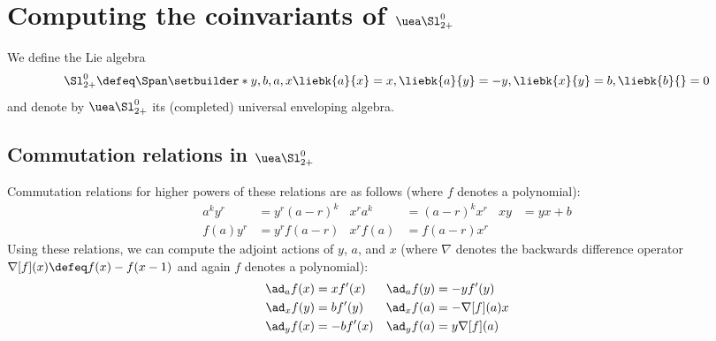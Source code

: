 \documentclass{article}
\begin{document}
\section{Computing the coinvariants of $\CU$}
\begin{definition}
       We define the Lie algebra
       \begin{equation}
               \Alg \defeq
               \Span\setbuilder*{y, b, a, x}{
                       \liebk{a}{x}=x,
                       \liebk{a}{y}=-y,
                       \liebk{x}{y}=b,
                       \liebk{b}{}=0
               }
       \end{equation}
       and denote by $\CU$ its (completed) universal enveloping algebra.
\end{definition}

\subsection{Commutation relations in $\CU$}
Commutation relations for higher powers of these relations are as follows (where
$f$ denotes a polynomial):
\begin{align}
        a^ky^r &= y^r(a-r)^{k} &
        x^ra^{k} &= (a-r)^kx^r &
        xy &= yx + b
        \\
        f(a)y^r &= y^rf(a-r) &
        x^rf(a) &= f(a-r)x^r &
\end{align}
Using these relations, we can compute the adjoint actions of $y$, $a$, and $x$
(where $\nabla$ denotes the backwards difference operator $\nabla[f](x) \defeq
f(x) - f(x-1)$ and again $f$ denotes a polynomial):
\begin{align}
  \ad_a f(x) &= xf'(x)&
  \ad_a f(y) &= -yf'(y)\label{eq:ada}\\
  \ad_x f(y) &= bf'(y) &
  \ad_x f(a) &= -\nabla[f](a)x\label{eq:adx}\\
  \ad_y f(x) &= -bf'(x) &
  \ad_y f(a) &= y\nabla[f](a)\label{eq:ady}
\end{align}
\end{document}
